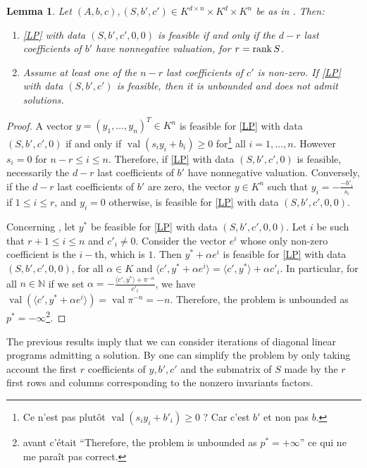 \documentclass[a4paper,oneside,11pt]{article}
\newtheorem{lemma}[theorem]{Lemma}
\newcommand{\simone}[1]{{\color{blue} #1}} %
\newcommand{\corentin}[1]{{\color{red} #1}} %
\DeclareMathOperator{\val}{val}
\begin{document}
\begin{lemma}\label{prop:reduc}
  Let $(A,b,c), (S,b',c') \in K^{d\times n} \times K^d \times K^n$ be as in .
  Then:
  \begin{enumerate}
  \item \label{prop:reduc_it1}
    \eqref{LP} with data $(S,b',c',0,0)$ is feasible if and only if the $d-r$ last coefficients
    of $b'$ have nonnegative valuation, for $r = {\rm rank}\,S$.
  \item \label{prop:reduc_it2}
    Assume at least one of the $n-r$ last coefficients of $c'$ is non-zero. If \eqref{LP} with
    data $(S,b',c')$ is feasible, then it is unbounded and does not admit solutions.
  \end{enumerate}
\end{lemma}
\begin{proof}
  A vector $y = (y_1, \ldots, y_n)^T \in K^n$ is feasible for \eqref{LP} with data
  $(S,b',c',0)$ if and only if $\val(s_i y_i + b_i) \geq 0$ for\footnote{\simone{Ce n'est pas plutôt $\val(s_i y_i + b'_i) \geq 0$ ? Car c'est $b'$ et non pas $b$.}} all $i = 1,\ldots,n$.
  However $s_i = 0$ for $n-r \leq i\leq n$. Therefore, if \eqref{LP} with data $(S,b',c',0)$ is feasible,
  necessarily the $d-r$ last coefficients of $b'$ have nonnegative valuation.
  Conversely, if the $d-r$ last coefficients of $b'$ are zero, the vector $y \in K^n$ such that
  $y_i = -\frac{-b'_i}{s_i}$ if $1 \leq i \leq r$, and $y_i =0$ otherwise, is feasible for \eqref{LP}
  with data $(S,b',c',0,0)$.

  Concerning , let $y^*$ be feasible for \eqref{LP} with data $(S,b',c',0,0)$.
  Let $i$ be such that $r+1 \leq i \leq n$ and $c'_i \neq 0$. Consider the vector $e^i$ whose only non-zero
  coefficient is the $i-$th, which is $1$. Then $y^* + \alpha e^i$ is feasible for \eqref{LP} with data $(S,b',c',0,0)$,
  for all $\alpha \in K$ and $\langle c', y^* + \alpha e^i\rangle = \langle c' , y^* \rangle + \alpha c'_i$.
  In particular, for all $n \in \mathbb{N}$ if we set $\alpha = -\frac{\langle c', y^* \rangle + \pi^{-n}}{c'_i}$, we have $\val \left( \langle c', y^* + \alpha e ^i \rangle\right) = \val \pi^{-n} = -n$. Therefore, the problem is unbounded as $p^* = -\infty$\footnote{\simone{avant c'était ``Therefore, the problem is unbounded as $p^* = +\infty$'' ce qui ne me paraît pas correct.}}. 
\end{proof}

The previous results imply that we can consider iterations of diagonal linear programs admitting a solution. By  one can simplify the problem by only taking account the first $r$ coefficients of $y, b', c'$ and the submatrix of $S$ made by the $r$ first rows and columns corresponding to the nonzero invariants factors.
\end{document}
